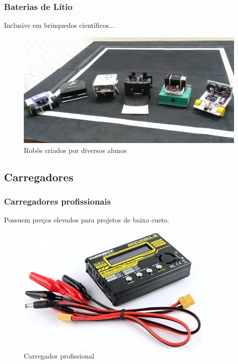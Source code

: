 \documentclass{beamer}
\begin{document}
\begin{frame}\frametitle{Baterias de Lítio}		
	Inclusive em brinquedos científicos...				\pause
	
\begin{figure}[h]
	\centering
	\includegraphics[width=\textwidth]{robos-sitec1}
	\caption{Robôs criados por diversos alunos}
	\label{fig:robos-sitec1}
\end{figure}
\end{frame}				
		
		
	\subsection{Carregadores}
	\begin{frame}\frametitle{Carregadores profissionais}
	Possuem preços elevados para projetos de baixo custo.
	
\begin{figure}[h]
	\centering
	\includegraphics[width=0.85\textwidth]{charger1}
	\caption{Carregador profissional}
	\label{fig:charger1}
\end{figure}
\end{frame}							
	
\end{document}
